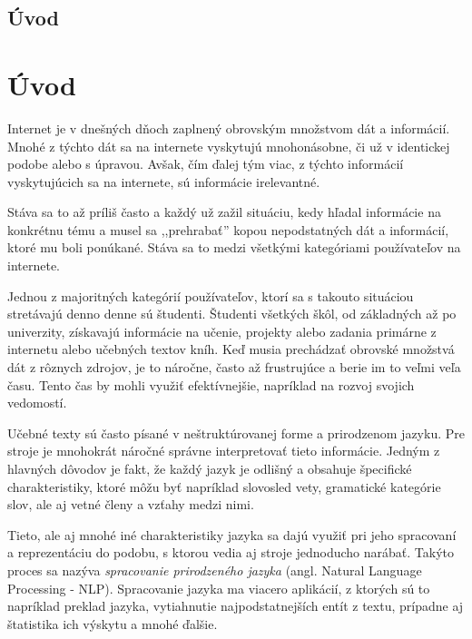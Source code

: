 \newpage
{}
{
	\section{Úvod}
}
{
	\chapter{Úvod}
}
Internet je v dnešných dňoch zaplnený obrovským množstvom dát a informácií. Mnohé z týchto dát sa na internete vyskytujú mnohonásobne, či už v identickej podobe alebo s úpravou. Avšak, čím ďalej tým viac, z týchto informácií vyskytujúcich sa na internete, sú informácie irelevantné.

Stáva sa to až príliš často a každý už zažil situáciu, kedy hľadal informácie na konkrétnu tému a musel sa ,,prehrabať'' kopou nepodstatných dát a informácií, ktoré mu boli ponúkané. Stáva sa to medzi všetkými kategóriami používateľov na internete.

Jednou z majoritných kategórií používateľov, ktorí sa s takouto situáciou stretávajú denno denne sú študenti. Študenti všetkých škôl, od základných až po univerzity, získavajú informácie na učenie, projekty alebo zadania primárne z internetu alebo učebných textov kníh. Keď musia prechádzať obrovské množstvá dát z rôznych zdrojov, je to náročne, často až frustrujúce a berie im to veľmi veľa času. Tento čas by mohli využiť efektívnejšie, napríklad na rozvoj svojich vedomostí.

Učebné texty sú často písané v neštruktúrovanej forme a prirodzenom jazyku. Pre stroje je mnohokrát náročné správne interpretovať tieto informácie. Jedným z hlavných dôvodov je fakt, že každý jazyk je odlišný a obsahuje špecifické charakteristiky, ktoré môžu byť napríklad slovosled vety, gramatické kategórie slov, ale aj vetné členy a vzťahy medzi nimi.

Tieto, ale aj mnohé iné charakteristiky jazyka sa dajú využiť pri jeho spracovaní a reprezentáciu do podobu, s ktorou vedia aj stroje jednoducho narábať. Takýto proces sa nazýva \textit{spracovanie prirodzeného jazyka} (angl. Natural Language Processing - NLP). Spracovanie jazyka ma viacero aplikácií, z ktorých sú to napríklad preklad jazyka, vytiahnutie najpodstatnejších entít z textu, prípadne aj štatistika ich výskytu a mnohé ďalšie.

